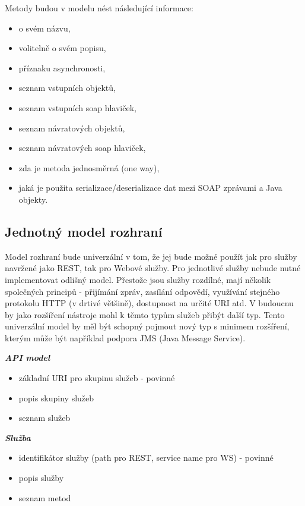 \documentclass[11pt,twoside,a4paper]{book}
\begin{document}
Metody budou v modelu nést následující informace:

\begin{itemize}
  \item o svém názvu,
  \item volitelně o svém popisu,
  \item příznaku asynchronosti,
  \item seznam vstupních objektů,
  \item seznam vstupních soap hlaviček,
  \item seznam návratových objektů,
  \item seznam návratových soap hlaviček,
  \item zda je metoda jednosměrná (one way),
  \item jaká je použita serializace/deserializace dat mezi SOAP zprávami a Java objekty.
\end{itemize}

\subsection{Jednotný model rozhraní}

Model rozhraní bude univerzální v tom, že jej bude možné použít jak pro služby navržené
jako REST, tak pro Webové služby. Pro jednotlivé služby nebude nutné implementovat
odlišný model. Přestože jsou služby rozdílné, mají několik společných principů - přijímání
zpráv, zasílání odpovědí, využívání stejného protokolu HTTP (v drtivé většině), dostupnost na
určité URI atd. V budoucnu by jako rozšíření nástroje mohl k těmto typům služeb přibýt další
typ. Tento univerzální model by měl být schopný pojmout nový typ s minimem rozšíření,
kterým může být například podpora JMS (Java Message Service).

\textbf{\textit{API model}}

\begin{itemize}
  \item základní URI pro skupinu služeb - povinné
  \item popis skupiny služeb
  \item seznam služeb
\end{itemize}

\textbf{\textit{Služba}}

\begin{itemize}
  \item identifikátor služby (path pro REST, service name pro WS) - povinné
  \item popis služby
  \item seznam metod
\end{itemize}
\end{document}
